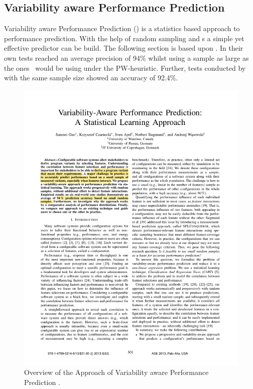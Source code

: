 \subsection{Variability aware Performance Prediction}\label{sec:VAPP}

Variability aware Performance Prediction (\VAPP) is a statistics based approach to performance prediction. With the help of random sampling and \CART s a simple yet effective predictor can be build. The following section is based upon \citet{VariabilityAwarePerformancePredictionJianmeiSigmundApel}. In their own tests \citet{VariabilityAwarePerformancePredictionJianmeiSigmundApel} reached an average precision of 94\% whilst using a sample as large as the ones \AFID~would be using under the PW-heuristic. Further, tests conducted by \citet{FasterDiscoveryofFasterSystemConfigurationsSiegmund2017} with the same sample size showed an accuracy of 92.4\%.\\
\setlength\intextsep{\baselineskip}
\begin{figure}
	\includegraphics[page=3,clip,trim=11cm 13.5cm 1.5cm 10.25cm, width=\linewidth ]{Paper/VariabilityAwarePerformancePredictionAStatisticalLearningApproach}
	\caption{Overview of the Approach of Variability aware Performance Prediction \cite{VariabilityAwarePerformancePredictionJianmeiSigmundApel}.}
	\label{fig:VAPPOverview}
\end{figure}
